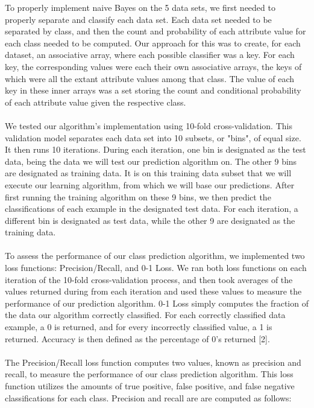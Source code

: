 \documentclass[twoside,11pt]{article}
\begin{document}
To properly implement naive Bayes on the 5 data sets, we first needed to properly separate and classify each data set. Each data set needed to be separated by class, and then the count and probability of each attribute value for each class needed to be computed. Our approach for this was to create, for each dataset, an associative array, where each possible classifier was a key. For each key, the corresponding values were each their own associative arrays, the keys of which were all the extant attribute values among that class. The value of each key in these inner arrays was a set storing the count and conditional probability of each attribute value given the respective class. \\ \\
We tested our algorithm's implementation using 10-fold cross-validation. This validation model separates each data set into 10 subsets, or "bins", of equal size. It then runs 10 iterations. During each iteration, one bin is designated as the test data, being the data we will test our prediction algorithm on. The other 9 bins are designated as training data. It is on this training data subset that we will execute our learning algorithm, from which we will base our predictions. After first running the training algorithm on these 9 bins, we then predict the classifications of each example in the designated test data. For each iteration, a different bin is designated as test data, while the other 9 are designated as the training data. \\ \\
To assess the performance of our class prediction algorithm, we implemented two loss functions: Precision/Recall, and 0-1 Loss. We ran both loss functions on each iteration of the 10-fold cross-validation process, and then took averages of the values returned during from each iteration and used these values to measure the performance of our prediction algorithm. 0-1 Loss simply computes the fraction of the data our algorithm correctly classified. For each correctly classified data example, a 0 is returned, and for every incorrectly classified value, a 1 is returned. Accuracy is then defined as the percentage of 0's returned [2].\\ \\
The Precision/Recall loss function computes two values, known as precision and recall, to measure the performance of our class prediction algorithm. This loss function utilizes the amounts of true positive, false positive, and false negative classifications for each class. Precision and recall are are computed as follows: 
\end{document}
